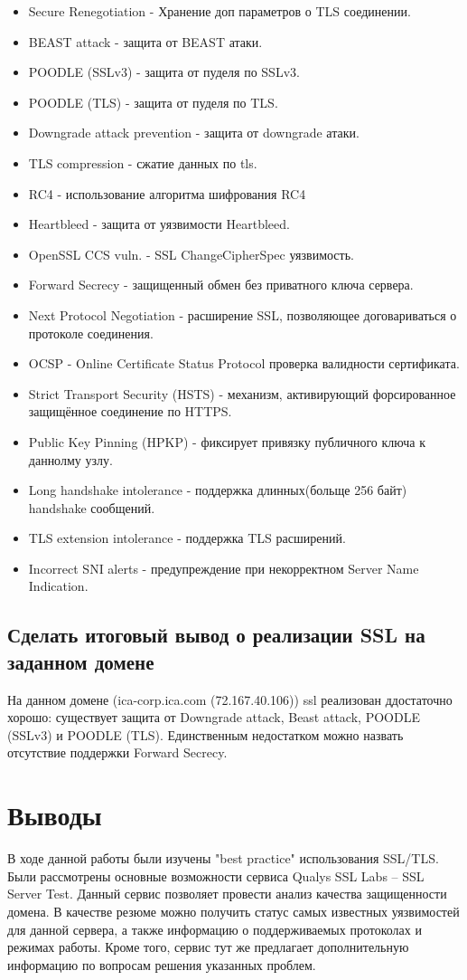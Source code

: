 \documentclass[10pt,a4paper]{article}
\begin{document}
\begin{itemize}
\item Secure Renegotiation - Хранение доп параметров о TLS соединении.
\item BEAST attack - защита от BEAST атаки.
\item POODLE (SSLv3) - защита от пуделя по SSLv3.
\item POODLE (TLS) - защита от пуделя по TLS.
\item Downgrade attack prevention - защита от downgrade атаки.
\item TLS compression - сжатие данных по tls.
\item RC4 - использование алгоритма шифрования RC4
\item Heartbleed - защита от уязвимости Heartbleed.
\item OpenSSL CCS vuln. - SSL ChangeCipherSpec уязвимость.
\item Forward Secrecy - защищенный обмен без приватного ключа сервера.
\item Next Protocol Negotiation - расширение SSL, позволяющее договариваться о протоколе соединения.
\item OCSP - Online Certificate Status Protocol проверка валидности сертификата.
\item Strict Transport Security (HSTS) - механизм, активирующий форсированное защищённое соединение по HTTPS.
\item Public Key Pinning (HPKP) - фиксирует привязку публичного ключа к даннолму узлу.
\item Long handshake intolerance - поддержка длинных(больще 256 байт) handshake сообщений.
\item TLS extension intolerance - поддержка TLS расширений.
\item Incorrect SNI alerts - предупреждение при некорректном Server Name Indication.
\end{itemize}


\subsection{Сделать итоговый вывод о реализации SSL на заданном домене}
На данном домене (ica-corp.ica.com (72.167.40.106)) ssl реализован ддостаточно хорошо: существует защита  от Downgrade attack, Beast attack, POODLE (SSLv3) и  POODLE (TLS). Единственным недостатком можно назвать отсутствие поддержки Forward Secrecy.

\section{Выводы}

В ходе данной работы были изучены "best practice" использования SSL/TLS. Были рассмотрены основные возможности сервиса Qualys SSL Labs – SSL Server Test. Данный сервис позволяет провести анализ качества защищенности домена. В качестве резюме можно получить статус самых известных уязвимостей для данной сервера, а также информацию о поддерживаемых протоколах и режимах работы. Кроме того, сервис тут же предлагает дополнительную информацию по вопросам решения указанных проблем. 
\end{document}
